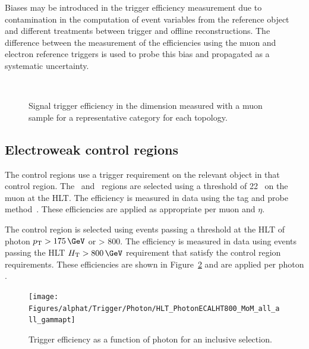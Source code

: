 Biases may be introduced in the trigger efficiency measurement due to contamination in the computation
of event variables from the reference object and different treatments between trigger and offline reconstructions.
The difference between the measurement of the efficiencies using the muon and electron reference 
triggers is used to probe this bias and propagated as a systematic uncertainty. 

\begin{figure}[h!]
  \begin{center}
    ~~
     \\
    \caption{Signal trigger efficiency in the \mht dimension measured with a muon sample for a representative category for each topology.}
    \label{fig:alphat_turnons}
  \end{center}
\end{figure}

\subsection{Electroweak control regions}

The control regions use a trigger requirement on the relevant object in that control region.
The \mj~and \mmj~regions are selected using a threshold of 22 \GeV~on the muon \pt at the HLT.
The efficiency is measured in data using the tag and probe method~\cite{MuonReco}. These efficiencies are 
applied as appropriate per muon \pt and $\eta$. 

The \gj control region is selected using events passing a threshold at the HLT of photon $\pt > 175 \,\GeV$ 
or \scalht > 800\GeV. The efficiency is measured in data using events passing the HLT $\scalht > 800\,\GeV$ 
requirement that satisfy the \gj control region requirements. These efficiencies are shown in
Figure~\ref{fig:photon_turnons_photonPt} and are applied per photon \pt.

\begin{figure}[h!]
  \begin{center}
    \texttt{[image: Figures/alphat/Trigger/Photon/HLT\_PhotonECALHT800\_MoM\_all\_all\_gammapt]}
    \caption{Trigger efficiency as a function of photon \pt for an inclusive selection.}
    \label{fig:photon_turnons_photonPt}
  \end{center}
\end{figure}

